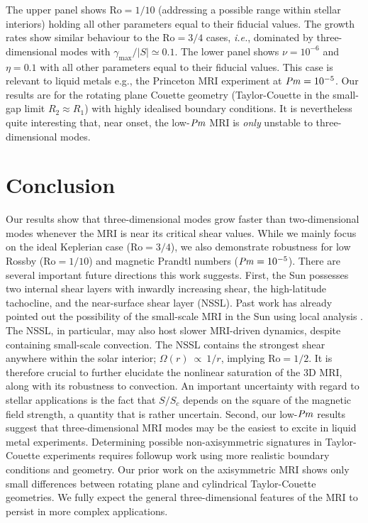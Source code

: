 \documentclass{rsproca_new}%
\newcommand{\SSC}{S/S_{c}}
\newcommand{\Prm}{\mbox{\textit{Pm}}}
\newcommand{\Ro}{\mathrm{Ro}}
\begin{document}
The upper panel shows $\Ro=1/10$ (addressing a possible range within stellar interiors) holding all other parameters equal to their fiducial values.
The growth rates show similar behaviour to the $\Ro=3/4$ cases, \textit{i.e.}, dominated by three-dimensional modes with $\gamma_{\max}/|S|\simeq0.1$.
The lower panel shows $\nu=10^{-6}$ and $\eta=0.1$ with all other parameters equal to their fiducial values. 
This case is relevant to liquid metals e.g., the Princeton MRI experiment \cite{2002JFM...462..365G}
at $\Prm=10^{-5}$. 
Our results are for the rotating plane Couette geometry (Taylor-Couette in the small-gap limit $R_{2}\approx{R}_{1}$) with highly idealised boundary conditions.
It is nevertheless quite interesting that, near onset, the low-$\Prm$ MRI is \emph{only} unstable to three-dimensional modes.

\section{Conclusion}
\label{sec:conclusion}

Our results show that three-dimensional modes grow faster than two-dimensional modes whenever the MRI is near its critical shear values.
While we mainly focus on the ideal Keplerian case ($\Ro=3/4$), we also demonstrate robustness for low Rossby ($\Ro=1/10$) and magnetic Prandtl numbers ($\Prm=10^{-5}$).
There are several important future directions this work suggests.
First, the Sun possesses two internal shear layers with inwardly increasing shear, the high-latitude tachocline, and the near-surface shear layer (NSSL). 
Past work has already pointed out the possibility of the small-scale MRI in the Sun using local analysis \cite{2007ApJ...667L.207P,2011MNRAS.411L..26M,2014ApJ...787...21K}.
The NSSL, in particular, may also host slower MRI-driven dynamics, despite containing small-scale convection.
The NSSL contains the strongest shear anywhere within the solar interior;  $\Omega(r) \ \propto \ 1/r$, implying $\Ro = 1/2$.
It is therefore crucial to further elucidate the nonlinear saturation of the 3D MRI, along with its robustness to convection.
An important uncertainty with regard to stellar applications is the fact that $\SSC$ depends on the square of the magnetic field strength, a quantity that is rather uncertain.
Second, our low-$\Prm$ results suggest that three-dimensional MRI modes may be the easiest to excite in liquid metal experiments.
Determining possible non-axisymmetric signatures in Taylor-Couette experiments requires followup work using more realistic boundary conditions and geometry. 
Our prior work on the axisymmetric MRI \cite{2017ApJ...841....1C,2017ApJ...841....2C} shows only small differences between rotating plane and cylindrical Taylor-Couette geometries. 
We fully expect the general three-dimensional features of the MRI to persist in more complex applications. 
\end{document}
